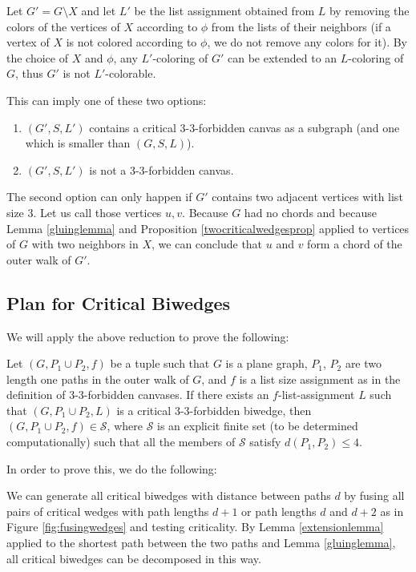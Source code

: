 Let $G' = G \setminus X$ and let $L'$ be the list assignment obtained from $L$ by removing the colors 
of the vertices of $X$ according to $\phi$ from the lists of their neighbors (if a vertex of $X$ is not
colored according to $\phi$, we do not remove any colors for it). By the choice of $X$ and $\phi$,
any $L'$-coloring of $G'$ can be extended to an $L$-coloring of $G$, thus $G'$ is not $L'$-colorable.

This can imply one of these two options:

\begin{enumerate}
	
	\item $(G', S, L')$ contains a critical 3-3-forbidden canvas as a subgraph (and one which is 
	smaller than $(G, S, L)$).
	\item $(G', S, L')$ is not a 3-3-forbidden canvas.
\end{enumerate}

The second option can only happen if $G'$ contains two adjacent vertices with list size $3$. 
Let us call those vertices $u, v$. Because $G$ had no chords and because Lemma \ref{gluinglemma} and
Proposition \ref{twocriticalwedgesprop} applied to vertices of $G$ 
with two neighbors in $X$, we can conclude that $u$ and $v$ form a chord of the outer walk of $G'$.


\subsection{Plan for Critical Biwedges}
\label{sec:biwedges}

We will apply the above reduction to prove the following:

\begin{conjecture}
\label{biwedgeconjecture}
Let $(G, P_1 \cup P_2, f)$ be a tuple such that $G$ is a plane graph, $P_1$, $P_2$ are two length one 
paths in the outer walk of $G$, and $f$ is a list size assignment as in the definition of 3-3-forbidden
canvases. If there exists an $f$-list-assignment $L$ such that $(G, P_1 \cup P_2, L)$ is a critical
3-3-forbidden biwedge, then $(G, P_1 \cup P_2, f) \in \mathcal{S}$, where $\mathcal{S}$ is an explicit
finite set (to be determined computationally) such that all the members of $\mathcal{S}$ satisfy
$d(P_1, P_2) \leq 4$.
\end{conjecture}

In order to prove this, we do the following:

We can generate all critical biwedges with distance between paths $d$ by fusing all pairs of critical
wedges with path lengths $d+1$ or path lengths $d$ and $d+2$ as in Figure \ref{fig:fusingwedges}
and testing criticality. 
By Lemma \ref{extensionlemma} applied to the shortest path between the two paths and Lemma 
\ref{gluinglemma}, all critical biwedges can be decomposed in this way. 

